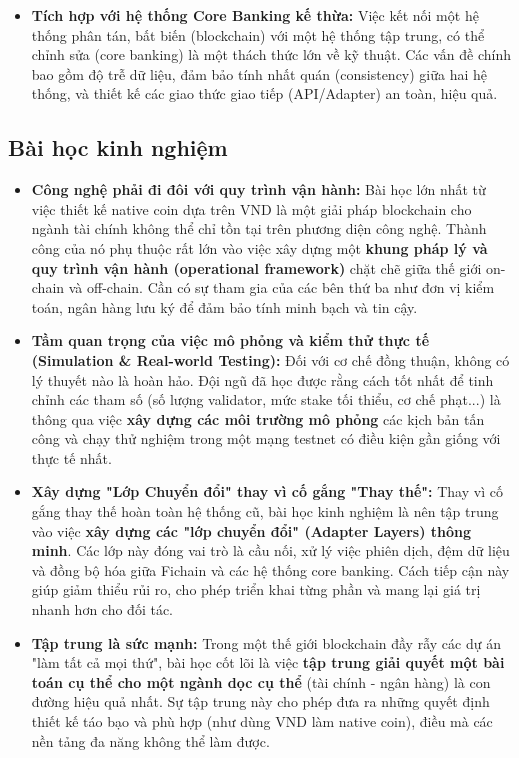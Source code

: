 \begin{itemize}
    \item \textbf{Tích hợp với hệ thống Core Banking kế thừa:}
    Việc kết nối một hệ thống phân tán, bất biến (blockchain) với một hệ thống tập trung, có thể chỉnh sửa (core banking) là một thách thức lớn về kỹ thuật. Các vấn đề chính bao gồm độ trễ dữ liệu, đảm bảo tính nhất quán (consistency) giữa hai hệ thống, và thiết kế các giao thức giao tiếp (API/Adapter) an toàn, hiệu quả.
\end{itemize}

\subsection{Bài học kinh nghiệm}
\begin{itemize}
    \item \textbf{Công nghệ phải đi đôi với quy trình vận hành:}
    Bài học lớn nhất từ việc thiết kế native coin dựa trên VND là một giải pháp blockchain cho ngành tài chính không thể chỉ tồn tại trên phương diện công nghệ. Thành công của nó phụ thuộc rất lớn vào việc xây dựng một \textbf{khung pháp lý và quy trình vận hành (operational framework)} chặt chẽ giữa thế giới on-chain và off-chain. Cần có sự tham gia của các bên thứ ba như đơn vị kiểm toán, ngân hàng lưu ký để đảm bảo tính minh bạch và tin cậy.

    \item \textbf{Tầm quan trọng của việc mô phỏng và kiểm thử thực tế (Simulation \& Real-world Testing):}
    Đối với cơ chế đồng thuận, không có lý thuyết nào là hoàn hảo. Đội ngũ đã học được rằng cách tốt nhất để tinh chỉnh các tham số (số lượng validator, mức stake tối thiểu, cơ chế phạt...) là thông qua việc \textbf{xây dựng các môi trường mô phỏng} các kịch bản tấn công và chạy thử nghiệm trong một mạng testnet có điều kiện gần giống với thực tế nhất.

    \item \textbf{Xây dựng "Lớp Chuyển đổi" thay vì cố gắng "Thay thế":}
    Thay vì cố gắng thay thế hoàn toàn hệ thống cũ, bài học kinh nghiệm là nên tập trung vào việc \textbf{xây dựng các "lớp chuyển đổi" (Adapter Layers) thông minh}. Các lớp này đóng vai trò là cầu nối, xử lý việc phiên dịch, đệm dữ liệu và đồng bộ hóa giữa Fichain và các hệ thống core banking. Cách tiếp cận này giúp giảm thiểu rủi ro, cho phép triển khai từng phần và mang lại giá trị nhanh hơn cho đối tác.

    \item \textbf{Tập trung là sức mạnh:}
    Trong một thế giới blockchain đầy rẫy các dự án "làm tất cả mọi thứ", bài học cốt lõi là việc \textbf{tập trung giải quyết một bài toán cụ thể cho một ngành dọc cụ thể} (tài chính - ngân hàng) là con đường hiệu quả nhất. Sự tập trung này cho phép đưa ra những quyết định thiết kế táo bạo và phù hợp (như dùng VND làm native coin), điều mà các nền tảng đa năng không thể làm được.
\end{itemize}
